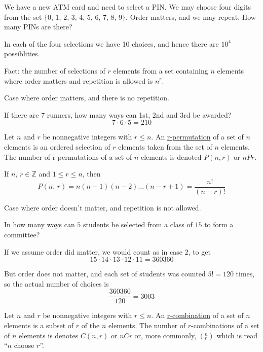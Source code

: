 \begin{example}
    We have a new ATM card and need to select a PIN. We may choose four digits from the set $\{0,\,1,\,2,\,3,\,4,\,5,\,6,\,7,\,8,\,9\}$. Order matters, and we may repeat. How many PINs are there?

    In each of the four selections we have 10 choices, and hence there are $10^4$ possiblities.
\end{example}

Fact: the number of selections of $r$ elements from a set containing $n$ elements where order matters and repetition is allowed is $n^r$.

Case where order matters, and there is no repetition.

\begin{example}
    If there are 7 runners, how many ways can 1st, 2nd and 3rd be awarded? $$7\cdot 6\cdot 5 = 210$$
\end{example}

\begin{definition}
    Let $n$ and $r$ be nonnegative integers with $r\leq n$. An \underline{r-permutation} of a set of $n$ elements is an ordered selection of $r$ elements taken from the set of $n$ elements. The number of r-permutations of a set of $n$ elements is denoted $P(n,r)$ or $nPr$.
\end{definition}

\begin{theorm}
    If $n,\,r\in\mathbb Z$ and $1\leq r\leq n$, then $$P(n,\,r) = n(n-1)(n-2)\dots (n-r+1) = \frac{n!}{\left(n-r\right)!}$$
\end{theorm}

Case where order doesn't matter, and repetition is not allowed.

\begin{example}
    In how many ways can $5$ students be selected from a class of $15$ to form a committee?

    If we assume order did matter, we would count as in case 2, to get $$15\cdot 14\cdot 13\cdot 12\cdot 11 = 360360$$

    But order does not matter, and each set of students was counted $5! = 120$ times, so the actual number of choices is $$\frac{360360}{120} = 3003$$
\end{example}

\begin{definition}
    Let $n$ and $r$ be nonnegative integers with $r\leq n$. An \underline{r-combination} of a set of $n$ elements is a subset of $r$ of the $n$ elements. The number of $r$-combinations of a set of $n$ elements is denotes $C(n,r)$ or $nCr$ or, more commonly, $\left(^n_r\right)$ which is read ``$n$ choose $r$''.
\end{definition}


